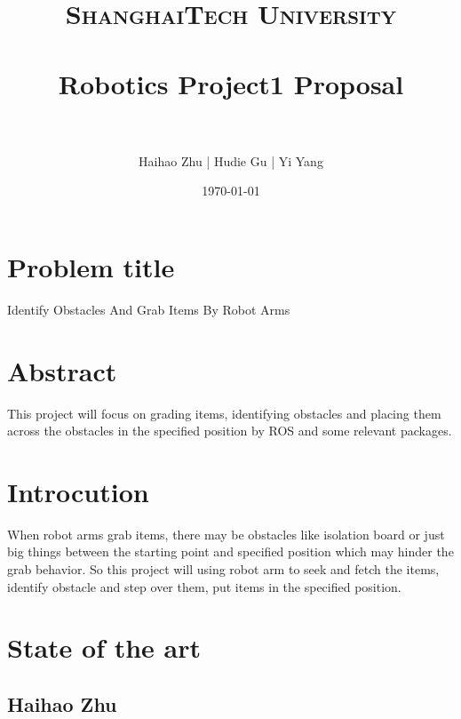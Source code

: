 \documentclass[paper=a4, fontsize=11pt]{scrartcl} %
\title{	
\normalfont \normalsize 
\textsc{ShanghaiTech University} \\ [25pt] %
\horrule{0.5pt} \\[0.4cm] %
\huge{Robotics Project1 Proposal} \\ %
\horrule{2pt} \\[0.5cm] %
}
\author{Haihao Zhu | Hudie Gu | Yi Yang} %
\date{\normalsize\today} %
\numberwithin{equation}{section} %
\numberwithin{figure}{section} %
\numberwithin{table}{section} %
\begin{document}
\maketitle %

\section{Problem title}

Identify Obstacles And Grab Items By Robot Arms


\section{Abstract}

This project will focus on grading items, identifying obstacles and placing them across the obstacles in the specified position by ROS and some relevant packages. 


\section{Introcution}

When robot arms grab items, there may be obstacles like isolation board or just big things between the starting point and specified position which may hinder the grab behavior. So this project will using robot arm to seek and fetch the items, identify obstacle and step over them, put items in the specified position.

\section{State of the art}

\subsection{Haihao Zhu}
\end{document}
